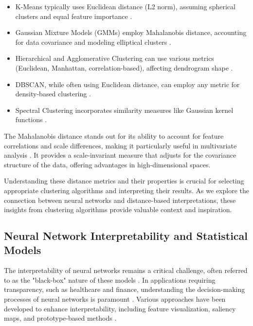 \begin{itemize}
    \item K-Means typically uses Euclidean distance (L2 norm), assuming spherical clusters and equal feature importance \citep{macqueen1967some}.
    
    \item Gaussian Mixture Models (GMMs) employ Mahalanobis distance, accounting for data covariance and modeling elliptical clusters \citep{reynolds2009gaussian}.
    
    \item Hierarchical and Agglomerative Clustering can use various metrics (Euclidean, Manhattan, correlation-based), affecting dendrogram shape \citep{murtagh1983survey}.
    
    \item DBSCAN, while often using Euclidean distance, can employ any metric for density-based clustering \citep{ester1996density}.
    
    \item Spectral Clustering incorporates similarity measures like Gaussian kernel functions \citep{von2007tutorial}.
\end{itemize}

The Mahalanobis distance stands out for its ability to account for feature correlations and scale differences, making it particularly useful in multivariate analysis \citep{mahalanobis1936generalized, demaesschalck2000mahalanobis}. It provides a scale-invariant measure that adjusts for the covariance structure of the data, offering advantages in high-dimensional spaces.

Understanding these distance metrics and their properties is crucial for selecting appropriate clustering algorithms and interpreting their results. As we explore the connection between neural networks and distance-based interpretations, these insights from clustering algorithms provide valuable context and inspiration.

\subsection{Neural Network Interpretability and Statistical Models}

The interpretability of neural networks remains a critical challenge, often referred to as the "black-box" nature of these models \citep{lipton2016mythos}. In applications requiring transparency, such as healthcare and finance, understanding the decision-making processes of neural networks is paramount \citep{rudin2019stop}. Various approaches have been developed to enhance interpretability, including feature visualization, saliency maps, and prototype-based methods \citep{erhan2009visualizing, simonyan2013deep, kim2016interpreting}.

